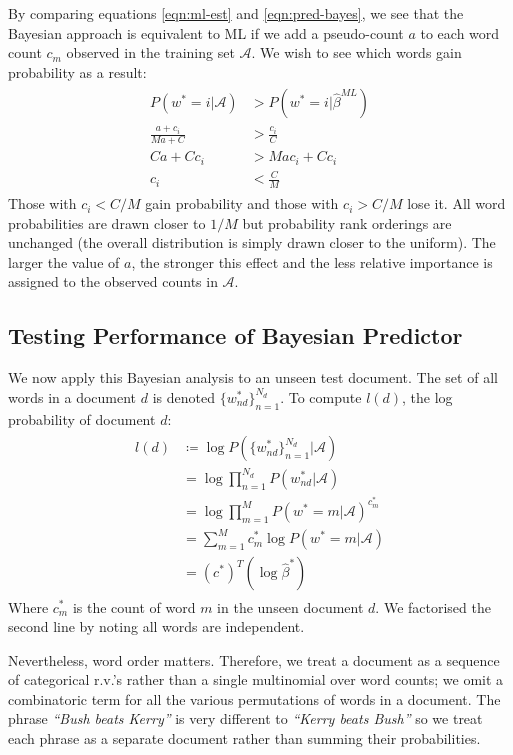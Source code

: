 \documentclass[]{article}
\newcommand{\Acal}{\mathcal{A}}
\newcommand{\betaml}{\hat{\beta}^{ML}}
\newcommand{\betastar}{\hat{\beta}^{*}}
\begin{document}
%
By comparing equations \ref{eqn:ml-est} and \ref{eqn:pred-bayes}, we see that the Bayesian approach is equivalent to ML if we add a pseudo-count $a$ to each word count $c_m$ observed in the training set $\Acal$. We wish to see which words gain probability as a result:
%
\begin{align}
\begin{split}
	P(w^*=i | \Acal) &> P(w^*=i | \betaml) \\
	\frac{a + c_i}{Ma + C} &> \frac{c_i}{C} \\
	Ca + Cc_i &> Mac_i + Cc_i \\
	c_i &< \frac{C}{M}
\end{split}
\end{align}
%
Those with $c_i < C/M$ gain probability and those with $c_i > C/M$ lose it. All word probabilities are drawn closer to $1/M$ but probability rank orderings are unchanged (the overall distribution is simply drawn closer to the uniform). The larger the value of $a$, the stronger this effect and the less relative importance is assigned to the observed counts in $\Acal$.

\clearpage
\subsection{Testing Performance of Bayesian Predictor}

We now apply this Bayesian analysis to an unseen test document. The set of all words in a document $d$ is denoted $\{w^*_{nd}\}_{n=1}^{N_d}$. To compute $l(d)$, the log probability of document $d$:
%
\begin{align}
\begin{split}
	l(d) &\coloneqq \log P(\{w^*_{nd}\}_{n=1}^{N_d} | \Acal) \\
	&= \log \prod_{n=1}^{N_d} P(w^*_{nd} | \Acal) \\
	&= \log \prod_{m = 1}^{M} P(w^*=m | \Acal)^{c^*_{m}} \\
	&= \sum_{m=1}^{M} c^*_{m} \log P(w^* = m | \Acal) \\
	&= (c^*)^T (\log \betastar)
\end{split}
\label{eqn:test-doc-prob}
\end{align}
%
Where $c^*_{m}$ is the count of word $m$ in the unseen document $d$. We factorised the second line by noting all words are independent.

Nevertheless, word order matters. Therefore, we treat a document as a sequence of categorical r.v.'s rather than a single multinomial over word counts; we omit a combinatoric term for all the various permutations of words in a document. The phrase \textit{``Bush beats Kerry''} is very different to \textit{``Kerry beats Bush''} so we treat each phrase as a separate document rather than summing their probabilities.
\end{document}
